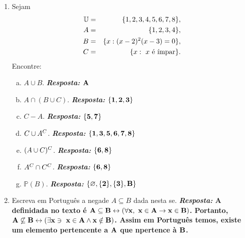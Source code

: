 \begin{enumerate}[{\bf 1.}]
\item Sejam
\begin{eqnarray*}
\mathbb{U}&=&\{1,2,3,4,5,6,7,8\},\\
A&=&\{1,2,3,4\},\\
B&=&\{x:(x-2)^2(x-3)=0\},\\
C&=&\{x:\espaco x \textrm{ \'e \ih mpar}\}.
\end{eqnarray*}
Encontre:
\begin{enumerate}[a)]
\item $A\cup B$. {\bf{\it Resposta:} ${\bf A}$}
\item $A\cap(B\cup C)$. {\bf{\it Resposta:} ${\bf \{1,2,3\}}$}
\item $C-A$. {\bf{\it Resposta:} ${\bf \{5,7\}}$}
\item $C\cup A^C$. {\bf{\it Resposta:} ${\bf \{1,3,5,6,7,8\}}$}
\item $(A\cup C)^C$. {\bf{\it Resposta:} ${\bf \{6,8\}}$}
\item $A^C\cap C^C$. {\bf{\it Resposta:} ${\bf \{6,8\}}$}
\item $\mathbb{P}(B)$. {\bf{\it Resposta:} ${\bf \{\varnothing,\{2\},\{3\},B\}}$}
\end{enumerate}

\item Escreva em Portugu\^es a nega\cao de $A\subseteq B$ dada nesta se\caoi.
{\bf{\it Resposta:} A defini\cao dada no texto \'e ${\bf A \subseteq B \leftrightarrow (\forall x,\textrm{ } x\in A \to x\in B)}$. Portanto, ${\bf A \not\subseteq B \leftrightarrow (\exists x \ni \textrm{ } x\in A \wedge x\notin B)}$. Assim em Portugu\^es temos, existe um elemento pertencente a ${\bf A}$ que n\ao pertence \`a ${\bf B}$.}


\end{enumerate}
